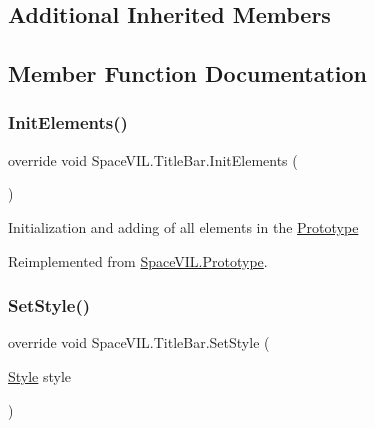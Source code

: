 \subsection*{Additional Inherited Members}


\subsection{Member Function Documentation}
\mbox{\label{class_space_v_i_l_1_1_title_bar_a8ee9e176f0eb7d4fcf1a4309bd8c2925}} 
\subsubsection{\texorpdfstring{Init\+Elements()}{InitElements()}}
{\footnotesize\ttfamily override void Space\+V\+I\+L.\+Title\+Bar.\+Init\+Elements (\begin{DoxyParamCaption}{ }\end{DoxyParamCaption})\hspace{0.3cm}{\ttfamily [virtual]}}



Initialization and adding of all elements in the \mbox{\hyperlink{class_space_v_i_l_1_1_prototype}{Prototype}} 



Reimplemented from \mbox{\hyperlink{class_space_v_i_l_1_1_prototype_ac3379fe02923ee155b5b0084abf27420}{Space\+V\+I\+L.\+Prototype}}.

\mbox{\label{class_space_v_i_l_1_1_title_bar_aaeec14fb90014f8f6f922214958ce798}} 
\subsubsection{\texorpdfstring{Set\+Style()}{SetStyle()}}
{\footnotesize\ttfamily override void Space\+V\+I\+L.\+Title\+Bar.\+Set\+Style (\begin{DoxyParamCaption}\item[{\mbox{\hyperlink{class_space_v_i_l_1_1_decorations_1_1_style}{Style}}}]{style }\end{DoxyParamCaption})\hspace{0.3cm}{\ttfamily [virtual]}}



